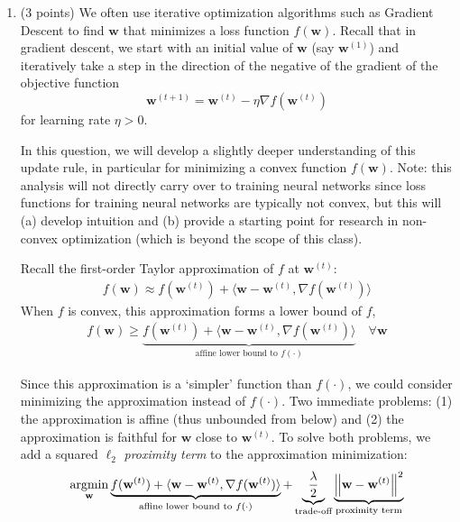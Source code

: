 \documentclass[11pt,english]{article}
\begin{document}
\begin{enumerate}[start]

\item (3 points)
We often use iterative optimization algorithms such as Gradient Descent to
find $\mathbf{w}$ that minimizes a loss function $f(\mathbf{w})$. Recall that in gradient descent,
we start with an initial value of $\mathbf{w}$ (say $\mathbf{w}^{(1)}$) and iteratively take a step in the direction
of the negative of the gradient of the objective function \ie
%
\begin{equation}
\mathbf{w}^{(t+1)} = \mathbf{w}^{(t)} - \eta\nabla f(\mathbf{w}^{(t)})
\end{equation}
%
for learning rate $\eta > 0$.

In this question, we will develop a slightly deeper understanding of this update rule, in particular for 
minimizing a convex function $f(\mathbf{w})$. Note: this analysis will not directly carry over to training neural networks 
since loss functions for training neural networks are typically not convex, but this will (a) develop intuition 
and (b) provide a starting point for research in non-convex optimization (which is beyond the scope of this class). 


Recall the first-order Taylor approximation of $f$ at $\mathbf{w}^{(t)}$:
%
\begin{align}
f(\mathbf{w}) \approx f(\mathbf{w}^{(t)}) + \langle \mathbf{w}-\mathbf{w}^{(t)},
\nabla f(\mathbf{w}^{(t)}) \rangle
\end{align}
%
When $f$ is convex, this approximation forms a lower bound of $f$, \ie 
\begin{align}
f(\mathbf{w}) \ge 
\underbrace{
f(\mathbf{w}^{(t)}) + \langle \mathbf{w}-\mathbf{w}^{(t)}, 
\nabla f(\mathbf{w}^{(t)}) \rangle
}_{\text{affine lower bound to $f(\cdot)$}}
 \quad \forall \mathbf{w}
\end{align}
%

Since this approximation
is a `simpler' function than $f(\cdot)$, we could consider minimizing the approximation instead of $f(\cdot)$.
Two immediate problems: (1) the approximation is affine (thus unbounded from below) and
(2) the approximation is faithful for $\mathbf{w}$ close to $\mathbf{w}^{(t)}$.
To solve both problems, we add a squared $\ell_2$ \emph{proximity term} to the approximation minimization:
%
\begin{equation}
\mathop{\mathrm{argmin}}_\mathbf{w}
\underbrace{
f(\mathbf{w}^{(t)}) + \langle \mathbf{w}-\mathbf{w}^{(t)}, \nabla f(\mathbf{w}^{(t)}) \rangle
}_{\text{affine lower bound to $f(\cdot)$}}
+
\underbrace{
\frac{\lambda}{2}
}_{\text{trade-off}}
\underbrace{
\left| \hspace{-0.7pt}\left|\mathbf{w} - \mathbf{w}^{(t)}\right| \hspace{-0.7pt}\right|^2
}_{\text{proximity term}}
\end{equation}
%


\end{enumerate}
\end{document}
